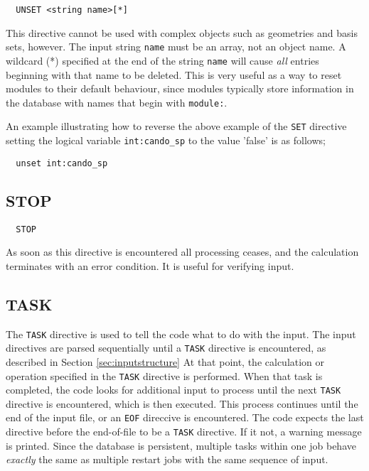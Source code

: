 \begin{verbatim}
  UNSET <string name>[*]
\end{verbatim}

This directive cannot be used with complex objects such as geometries and
basis sets, however.  The input string \verb+name+ must be an array, not
an object name. A wildcard (*) specified at the end of the 
string \verb+name+ will cause {\em all}
entries beginning with that name to be deleted.  This is very useful as a
way to reset modules to their default behaviour, since modules typically store
information in the database with names that begin with
\verb+module:+.

An example illustrating how to reverse the above example of the
\verb+SET+ directive setting the logical variable \verb+int:cando_sp+ 
to the value 'false' is as follows;

\begin{verbatim}
  unset int:cando_sp
\end{verbatim}



\subsection{STOP}

\begin{verbatim}
  STOP
\end{verbatim}

As soon as this directive is encountered all processing ceases, and
the calculation terminates with an error condition.  It is useful for
verifying input.

\subsection{TASK}
\label{sec:task}

The \verb+TASK+ directive is used to tell the code what to do with the input.
The input directives are parsed
sequentially until a \verb+TASK+ directive is encountered, as described
in Section \ref{sec:inputstructure}  At that
point, the calculation or operation specified in the \verb+TASK+ directive
is performed.  When that task is completed,
the code looks for additional input to process until the next
\verb+TASK+ directive is encountered, which is then executed.  This 
process continues until the end of the input file, or an \verb+EOF+
direccive is encountered.  The code expects the last directive before the
end-of-file to be a \verb+TASK+ directive.  If it not, a warning message 
is printed.  Since the
database is persistent, multiple tasks within one job behave {\em
  exactly} the same as multiple restart jobs with the same sequence of
input.

